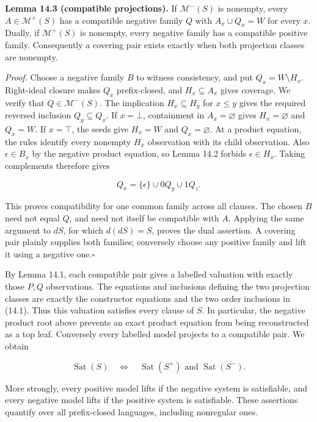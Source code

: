 \documentclass[
  11pt,
  a4paper,
]{article}
\newcounter{none} %
\begin{document}

\textbf{Lemma 14.3 (compatible projections).} If \(\mathcal M^-(S)\) is
nonempty, every \(A\in\mathcal M^+(S)\) has a compatible negative family
\(Q\) with \(A_x\cup Q_x=W\) for every \(x\). Dually, if
\(\mathcal M^+(S)\) is nonempty, every negative family has a compatible
positive family. Consequently a covering pair exists exactly when both
projection classes are nonempty.

\emph{Proof.} Choose a negative family \(B\) to witness consistency, and
put \(Q_x=W\setminus H_x\). Right-ideal closure makes \(Q_x\)
prefix-closed, and \(H_x\subseteq A_x\) gives coverage. We verify that
\(Q\in\mathcal M^-(S)\). The implication \(H_x\subseteq H_y\) for
\(x\le y\) gives the required reversed inclusion \(Q_y\subseteq Q_x\).
If \(x=\bot\), containment in \(A_x=\varnothing\) gives
\(H_x=\varnothing\) and \(Q_x=W\). If \(x=\top\), the seeds give
\(H_x=W\) and \(Q_x=\varnothing\). At a product equation, the rules
identify every nonempty \(H_x\) observation with its child observation.
Also \(\epsilon\in B_x\) by the negative product equation, so Lemma 14.2
forbids \(\epsilon\in H_x\). Taking complements therefore gives

\[Q_x=\{\epsilon\}\cup0Q_y\cup1Q_z.\]

This proves compatibility for one common family across all clauses. The
chosen \(B\) need not equal \(Q\), and need not itself be compatible
with \(A\). Applying the same argument to \(dS\), for which \(d(dS)=S\),
proves the dual assertion. A covering pair plainly supplies both
families; conversely choose any positive family and lift it using a
negative one.\nobreak\hspace{.5em}\(\square\)

By Lemma 14.1, each compatible pair gives a labelled valuation with
exactly those \(P,Q\) observations. The equations and inclusions
defining the two projection classes are exactly the constructor
equations and the two order inclusions in (14.1). Thus this valuation
satisfies every clause of \(S\). In particular, the negative product
root above prevents an exact product equation from being reconstructed
as a top leaf. Conversely every labelled model projects to a compatible
pair. We obtain

\[\operatorname{Sat}(S)\quad\Longleftrightarrow\quad
\operatorname{Sat}(S^+)\text{ and }\operatorname{Sat}(S^-). \tag{14.2}\]

More strongly, every positive model lifts if the negative system is
satisfiable, and every negative model lifts if the positive system is
satisfiable. These assertions quantify over all prefix-closed languages,
including nonregular ones.
\end{document}

